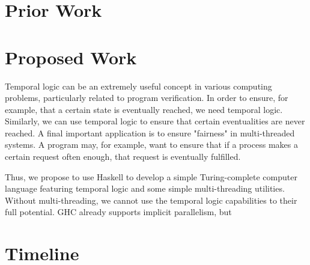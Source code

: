 \documentclass[numbers]{sigplanconf}
\begin{document}
\section{Prior Work}

\section{Proposed Work}
Temporal logic can be an extremely useful concept in various computing problems, particularly related to program verification. In order to ensure, for example, that a certain state is eventually reached, we need temporal logic. Similarly, we can use temporal logic to ensure that certain eventualities are never reached. A final important application is to ensure "fairness" in multi-threaded systems. A program may, for example, want to ensure that if a process makes a certain request often enough, that request is eventually fulfilled.

Thus, we propose to use Haskell to develop a simple Turing-complete computer language featuring temporal logic and some simple multi-threading utilities. Without multi-threading, we cannot use the temporal logic capabilities to their full potential. GHC already supports implicit parallelism, but 
\section{Timeline}







{}
\end{document}
